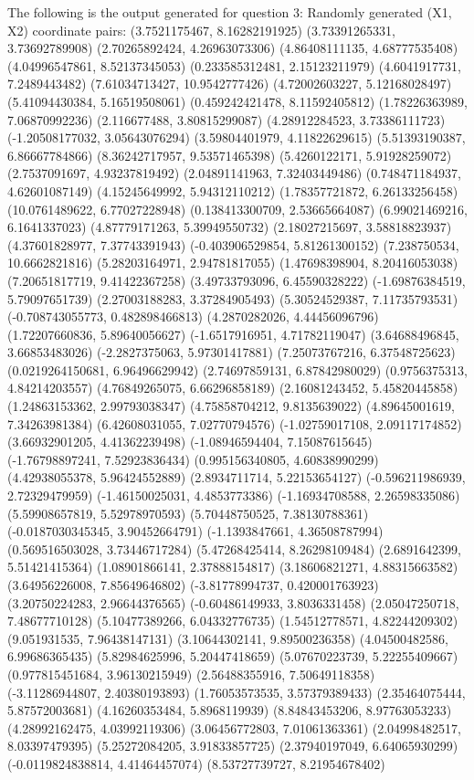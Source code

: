 \documentclass{article}
\begin{document}
\newpage
The following is the output generated for question 3:
Randomly generated (X1, X2) coordinate pairs:
(3.7521175467, 8.16282191925)
(3.73391265331, 3.73692789908)
(2.70265892424, 4.26963073306)
(4.86408111135, 4.68777535408)
(4.04996547861, 8.52137345053)
(0.233585312481, 2.15123211979)
(4.6041917731, 7.2489443482)
(7.61034713427, 10.9542777426)
(4.72002603227, 5.12168028497)
(5.41094430384, 5.16519508061)
(0.459242421478, 8.11592405812)
(1.78226363989, 7.06870992236)
(2.116677488, 3.80815299087)
(4.28912284523, 3.73386111723)
(-1.20508177032, 3.05643076294)
(3.59804401979, 4.11822629615)
(5.51393190387, 6.86667784866)
(8.36242717957, 9.53571465398)
(5.4260122171, 5.91928259072)
(2.7537091697, 4.93237819492)
(2.04891141963, 7.32403449486)
(0.748471184937, 4.62601087149)
(4.15245649992, 5.94312110212)
(1.78357721872, 6.26133256458)
(10.0761489622, 6.77027228948)
(0.138413300709, 2.53665664087)
(6.99021469216, 6.1641337023)
(4.87779171263, 5.39949550732)
(2.18027215697, 3.58818823937)
(4.37601828977, 7.37743391943)
(-0.403906529854, 5.81261300152)
(7.238750534, 10.6662821816)
(5.28203164971, 2.94781817055)
(1.47698398904, 8.20416053038)
(7.20651817719, 9.41422367258)
(3.49733793096, 6.45590328222)
(-1.69876384519, 5.79097651739)
(2.27003188283, 3.37284905493)
(5.30524529387, 7.11735793531)
(-0.708743055773, 0.482898466813)
(4.2870282026, 4.44456096796)
(1.72207660836, 5.89640056627)
(-1.6517916951, 4.71782119047)
(3.64688496845, 3.66853483026)
(-2.2827375063, 5.97301417881)
(7.25073767216, 6.37548725623)
(0.0219264150681, 6.96496629942)
(2.74697859131, 6.87842980029)
(0.9756375313, 4.84214203557)
(4.76849265075, 6.66296858189)
(2.16081243452, 5.45820445858)
(1.24863153362, 2.99793038347)
(4.75858704212, 9.8135639022)
(4.89645001619, 7.34263981384)
(6.42608031055, 7.02770794576)
(-1.02759017108, 2.09117174852)
(3.66932901205, 4.41362239498)
(-1.08946594404, 7.15087615645)
(-1.76798897241, 7.52923836434)
(0.995156340805, 4.60838990299)
(4.42938055378, 5.96424552889)
(2.8934711714, 5.22153654127)
(-0.596211986939, 2.72329479959)
(-1.46150025031, 4.4853773386)
(-1.16934708588, 2.26598335086)
(5.59908657819, 5.52978970593)
(5.70448750525, 7.38130788361)
(-0.0187030345345, 3.90452664791)
(-1.1393847661, 4.36508787994)
(0.569516503028, 3.73446717284)
(5.47268425414, 8.26298109484)
(2.6891642399, 5.51421415364)
(1.08901866141, 2.37888154817)
(3.18606821271, 4.88315663582)
(3.64956226008, 7.85649646802)
(-3.81778994737, 0.420001763923)
(3.20750224283, 2.96644376565)
(-0.60486149933, 3.8036331458)
(2.05047250718, 7.48677710128)
(5.10477389266, 6.04332776735)
(1.54512778571, 4.82244209302)
(9.051931535, 7.96438147131)
(3.10644302141, 9.89500236358)
(4.04500482586, 6.99686365435)
(5.82984625996, 5.20447418659)
(5.07670223739, 5.22255409667)
(0.977815451684, 3.96130215949)
(2.56488355916, 7.50649118358)
(-3.11286944807, 2.40380193893)
(1.76053573535, 3.57379389433)
(2.35464075444, 5.87572003681)
(4.16260353484, 5.8968119939)
(8.84843453206, 8.97763053233)
(4.28992162475, 4.03992119306)
(3.06456772803, 7.01061363361)
(2.04998482517, 8.03397479395)
(5.25272084205, 3.91833857725)
(2.37940197049, 6.64065930299)
(-0.0119824838814, 4.41464457074)
(8.53727739727, 8.21954678402)
\end{document}
